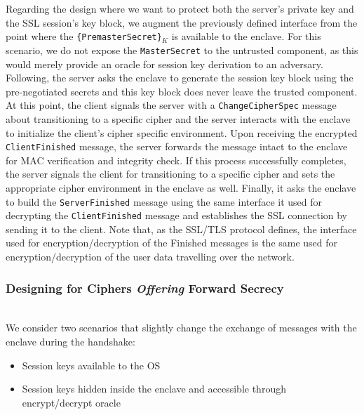 \documentclass[../main.tex]{subfiles}
\begin{document}
Regarding the design where we want to protect both the server's private key
and the SSL session's key block, we augment the previously defined interface
from the point where the \texttt{\{PremasterSecret\}$_K$} is available to the
enclave. For this scenario, we do not expose the \texttt{MasterSecret} to the
untrusted component, as this would merely provide an oracle for session key
derivation to an adversary. Following, the server asks the enclave to generate
the session key block using the pre-negotiated secrets and this key block does
never leave the trusted component. At this point, the client signals the server
with a \texttt{ChangeCipherSpec} message about transitioning to a specific
cipher and the server interacts with the enclave to initialize the client's
cipher specific environment. Upon receiving the encrypted
\texttt{ClientFinished} message, the server forwards the message intact to the
enclave for MAC verification and integrity check. If this process successfully
completes, the server signals the client for transitioning to a specific cipher
and sets the appropriate cipher environment in the enclave as well. Finally, it
asks the enclave to build the \texttt{ServerFinished} message using the same
interface it used for decrypting the \texttt{ClientFinished} message and
establishes the SSL connection by sending it to the client. Note that, as the
SSL/TLS protocol defines, the interface used for encryption/decryption of the
Finished messages is the same used for encryption/decryption of the user data
travelling over the network.

\subsubsection{Designing for Ciphers \textit{Offering} Forward Secrecy}


\noindent
\\We consider two scenarios that slightly change the exchange of
messages with the enclave during the handshake:
\begin{itemize}
  \item Session keys available to the OS
  \item Session keys hidden inside the enclave and accessible through
    encrypt/decrypt oracle
\end{itemize}
\end{document}
